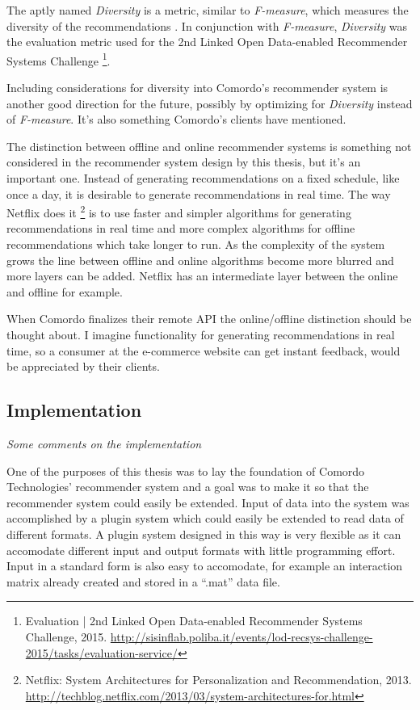 The aptly named \textit{Diversity} \citep{bobadilla2013recommender} is a metric, similar to \textit{F-measure}, which measures the diversity of the recommendations
. In conjunction with \textit{F-measure}, \textit{Diversity} was the evaluation metric used for the 2nd Linked Open Data-enabled Recommender Systems Challenge
\footnote{
Evaluation | 2nd Linked Open Data-enabled Recommender Systems Challenge, 2015.
\url{http://sisinflab.poliba.it/events/lod-recsys-challenge-2015/tasks/evaluation-service/}
}.

Including considerations for diversity into Comordo's recommender system is another good direction for the future, possibly by optimizing for \textit{Diversity} instead of \textit{F-measure}. It's also something Comordo's clients have mentioned.

The distinction between offline and online recommender systems is something not considered in the recommender system design by this thesis, but it's an important one. Instead of generating recommendations on a fixed schedule, like once a day, it is desirable to generate recommendations in real time. The way Netflix does it
\footnote{
Netflix: System Architectures for Personalization and Recommendation, 2013.
\url{http://techblog.netflix.com/2013/03/system-architectures-for.html}
}
is to use faster and simpler algorithms for generating recommendations in real time and more complex algorithms for offline recommendations which take longer to run.
As the complexity of the system grows the line between offline and online algorithms become more blurred and more layers can be added. Netflix has an intermediate layer between the online and offline for example.

When Comordo finalizes their remote API the online/offline distinction should be thought about. I imagine functionality for generating recommendations in real time, so a consumer at the e-commerce website can get instant feedback, would be appreciated by their clients.


\subsection{Implementation}

\textit{Some comments on the implementation}

One of the purposes of this thesis was to lay the foundation of Comordo Technologies' recommender system and a goal was to make it so that the recommender system could easily be extended. Input of data into the system was accomplished by a plugin system which could easily be extended to read data of different formats. A plugin system designed in this way is very flexible as it can accomodate different input and output formats with little programming effort. Input in a standard form is also easy to accomodate, for example an interaction matrix already created and stored in a ``.mat'' data file.

